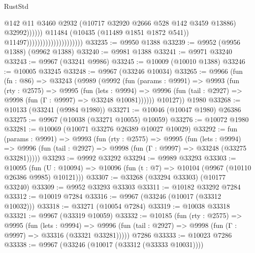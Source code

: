 \begin{lexlean}{RustStd}
\begin{coremodule}
                                                          @142
                                                          @11
                                                          @3460
                                                          @2932
                                                          (@10717
                                                            @32920
                                                            @2666
                                                            @528
                                                            @142
                                                            @3459
                                                            @13886)
                                                          @32992))))))
                                              @11484
                                              (@10435 (@11489 @1851 @1872 @541))
                                              @11497)))))))))))))))))))))
@33235 := @9950 @1388
@33239 := @9952 (@9956 @1388) (@9962 @1388)
@33240 := @9981 @1388
@33241 := @9971 @33240
@33243 := @9967 (@33241 @9986)
@33245 := @10009 (@10010 @1388)
@33246 := @10005 @33245
@33248 := @9967 (@33246 @10034)
@33265 := @9966
    (fun (fn : @86) =>
    @33243
      (@9989
        (@9992
          (fun (params : @9991) =>
          @9993
            (fun (rty : @2575) =>
            @9995
              (fun (lets : @9994) =>
              @9996 (fun (tail : @2927) => @9998 (fun (Γ : @9997) => @33248 @10081))))))
        @10127))
    @1980
@33268 := @10133 (@33241 (@9984 @1980))
@33271 := @10046 (@10047 @1980) @26386
@33275 := @9967 (@10038 (@33271 @10055) @10059)
@33276 := @10072 @1980
@33281 := @10069 (@10071 @33276 @26389 @10027 @10029)
@33292 := fun (params : @9991) =>
  @9993
    (fun (rty : @2575) =>
    @9995
      (fun (lets : @9994) =>
      @9996 (fun (tail : @2927) => @9998 (fun (Γ : @9997) => @33248 (@33275 @33281)))))
@33293 := @9992 @33292
@33294 := @9989 @33293
@33303 := @10095
    (fun (U : @10094) => @10096 (fun (t : @7) => @10104 (@9967 (@10110 @26386 @9985) @10121)))
@33307 := @33268 (@33294 @33303) (@10177 @33240)
@33309 := @9952 @33293 @33303
@33311 := @10182 @33292 @7284
@33312 := @10019 @7284
@33316 := @9967 (@33246 (@10017 (@33312 @10032)))
@33318 := @33271 (@10054 @7284)
@33319 := @10038 @33318
@33321 := @9967 (@33319 @10059)
@33332 := @10185
    (fun (rty : @2575) =>
    @9995
      (fun (lets : @9994) =>
      @9996 (fun (tail : @2927) => @9998 (fun (Γ : @9997) => @33316 (@33321 @33281)))))
    @7286
@33333 := @10023 @7286
@33338 := @9967 (@33246 (@10017 (@33312 (@33333 @10031))))

\end{coremodule}
\end{lexlean}
